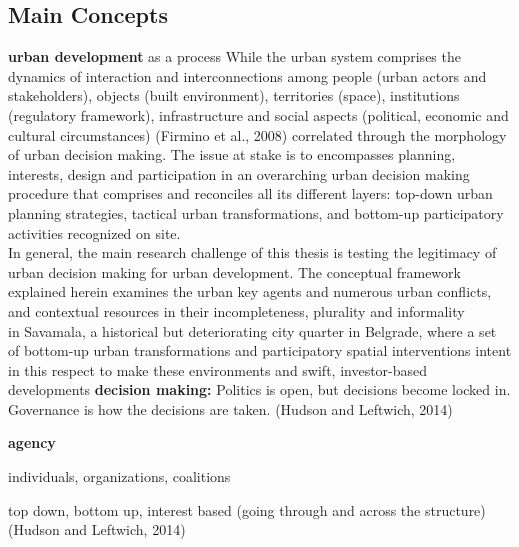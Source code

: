 \documentclass[11pt]{report}
\begin{document}
\subsection{Main Concepts}
\textbf{urban development} as a process
While the urban system comprises the dynamics of  interaction  and  interconnections among people (urban actors and stakeholders), objects (built environment), territories (space), institutions (regulatory framework), infrastructure and social  aspects (political, economic and cultural circumstances) (Firmino et al., 2008) correlated through the morphology of urban decision making. The issue at stake is to encompasses planning, interests, design and participation in an overarching urban decision making procedure that comprises and reconciles all its different layers: top-down urban planning strategies, tactical urban transformations, and bottom-up participatory activities recognized on site.  
\\
In general, the main research challenge of this thesis is testing the legitimacy of urban decision making for urban development.  
The conceptual framework explained herein examines the urban key agents
and numerous urban conflicts,  and contextual resources
in their incompleteness, plurality and informality
\\
in Savamala, a historical but deteriorating city quarter in Belgrade, where a set of bottom-up urban transformations and participatory spatial interventions intent in this respect to make these environments and swift, investor-based developments
\textbf{decision making:}
Politics is open, but decisions become locked in. Governance is how the decisions are taken. (Hudson and Leftwich, 2014)

\textbf{agency}

individuals, organizations, coalitions

top down, bottom up, interest based (going through and across the structure) (Hudson and Leftwich, 2014)
\end{document}

